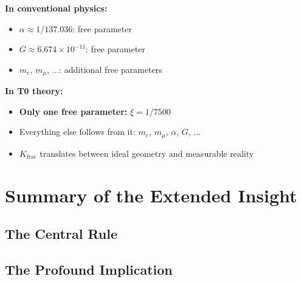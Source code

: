 \documentclass[12pt,a4paper]{article}
\begin{document}
	\textbf{In conventional physics:}
	\begin{itemize}
		\item $\alpha \approx 1/137.036$: free parameter
		\item $G \approx 6.674\times10^{-11}$: free parameter  
		\item $m_e$, $m_μ$, ...: additional free parameters
	\end{itemize}
	
	\textbf{In T0 theory:}
	\begin{itemize}
		\item \textbf{Only one free parameter:} $\xi = 1/7500$
		\item Everything else follows from it: $m_e$, $m_μ$, $\alpha$, $G$, ...
		\item $K_{\text{frac}}$ translates between ideal geometry and measurable reality
	\end{itemize}
	
	\section{Summary of the Extended Insight}
	
	\subsection{The Central Rule}
	
	\begin{center}
	\end{center}
	
	\subsection{The Profound Implication}
	
	\begin{center}
	\end{center}
	
\end{document}
